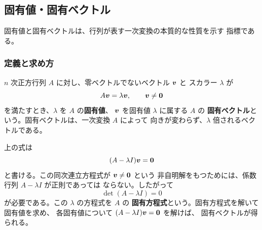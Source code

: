 \subsection{固有値・固有ベクトル}

固有値と固有ベクトルは、行列が表す一次変換の本質的な性質を示す
指標である。

\subsubsection{定義と求め方}

$n$ 次正方行列 $A$ に対し、零ベクトルでないベクトル $\bm{v}$ と
スカラー $\lambda$ が
\begin{equation}
 A\bm{v}=\lambda\bm{v},\qquad \bm{v}\ne\bm{0}
\end{equation}
を満たすとき、$\lambda$ を $A$ の\textbf{固有値}、
$\bm{v}$ を固有値 $\lambda$ に属する $A$ の
\textbf{固有ベクトル}という。固有ベクトルは、一次変換 $A$ によって
向きが変わらず、$\lambda$ 倍されるベクトルである。

上の式は
\[
 (A-\lambda I)\bm{v}=\bm{0}
\]
と書ける。この同次連立方程式が $\bm{v}\ne\bm{0}$ という
非自明解をもつためには、係数行列 $A-\lambda I$ が正則であっては
ならない。したがって
\begin{equation}
 \boxed{\det(A-\lambda I)=0}
\end{equation}
が必要である。この $\lambda$ の方程式を $A$ の
\textbf{固有方程式}という。固有方程式を解いて固有値を求め、
各固有値について $(A-\lambda I)\bm{v}=\bm{0}$ を解けば、
固有ベクトルが得られる。


